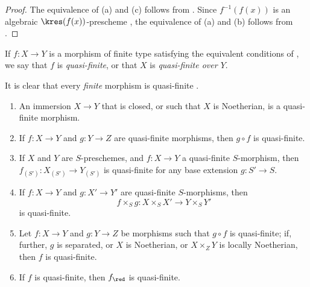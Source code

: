 \begin{proof}
The equivalence of (a) and (c) follows from .
Since $f^{-1}(f(x))$ is an algebraic $\kres(f(x))$-prescheme , the equivalence of (a) and (b) follows from .
\end{proof}

\begin{definition}[6.2.3]
\label{II.6.2.3}
If $f:X\to Y$ is a morphism of finite type satisfying the equivalent conditions of , we say that $f$ is \emph{quasi-finite}, or that $X$ is \emph{quasi-finite over $Y$}.
\end{definition}

It is clear that every \emph{finite} morphism is quasi-finite .

\begin{proposition}[6.2.4]
\label{II.6.2.4}
\medskip\noindent
\begin{enumerate}
  \item[(i)] An immersion $X\to Y$ that is closed, or such that $X$ is Noetherian, is a quasi-finite morphism.
  \item[(ii)] If $f:X\to Y$ and $g:Y\to Z$ are quasi-finite morphisms, then $g\circ f$ is quasi-finite.
  \item[(iii)] If $X$ and $Y$ are $S$-preschemes, and $f:X\to Y$ a quasi-finite $S$-morphism, then $f_{(S')}:X_{(S')}\to Y_{(S')}$ is quasi-finite for any base extension $g:S'\to S$.
  \item[(iv)] If $f:X\to Y$ and $g:X'\to Y'$ are quasi-finite $S$-morphisms, then
    \[
      f\times_S g : X\times_S X' \to Y\times_S Y'
    \]
    is quasi-finite.
  \item[(v)] Let $f:X\to Y$ and $g:Y\to Z$ be morphisms such that $g\circ f$ is quasi-finite; if, further, $g$ is separated, or $X$ is Noetherian, or $X\times_Z Y$ is locally Noetherian, then $f$ is quasi-finite.
  \item[(vi)] If $f$ is quasi-finite, then $f_\red$ is quasi-finite.
\end{enumerate}
\end{proposition}

